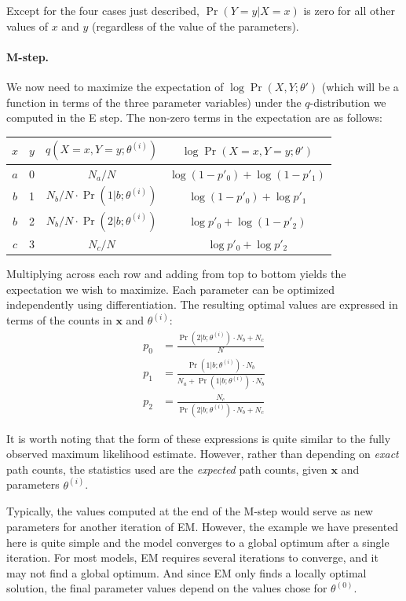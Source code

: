 \noindent Except for the four cases just described, $\Pr(Y=y|X=x)$ is
zero for all other values of $x$ and $y$ (regardless of the value of
the parameters).

\paragraph{\textbf{M-step.}}
We now need to maximize the expectation of $\log \Pr(X,Y;\theta')$
(which will be a function in terms of the three parameter variables)
under the $q$-distribution we computed in the E step.  The non-zero
terms in the expectation are as follows:
\begin{center}
\begin{tabular}{c|c|c|c}
$x$ & $y$ & $q(X=x,Y=y;\theta^{(i)})$ & $\log \Pr(X=x,Y=y;\theta')$ \\
\hline
$a$ & 0 & $N_a/N$ & $\log (1-p'_0) + \log (1 - p'_1)$ \\
$b$ & 1 & $N_b/N \cdot \Pr(1|b;\theta^{(i)}) $ & $\log(1 - p'_0) + \log p'_1$ \\
$b$ & 2 & $N_b/N \cdot \Pr(2|b;\theta^{(i)}) $ & $\log p'_0 + \log (1-p'_2)$ \\
$c$ & 3 & $N_c/N$ & $\log p'_0 + \log p'_2$ \\
\end{tabular}
\end{center}

\noindent Multiplying across each row and adding from top to bottom
yields the expectation we wish to maximize.  Each parameter can be
optimized independently using differentiation.  The resulting optimal
values are expressed in terms of the counts in $\textbf{x}$ and
$\theta^{(i)}$:
\begin{align}
p_0 &= \frac{\Pr(2|b;\theta^{(i)}) \cdot N_b + N_c}{N} \\
p_1 &= \frac{\Pr(1|b;\theta^{(i)}) \cdot N_b}{N_a + \Pr(1|b;\theta^{(i)}) \cdot N_b} \\
p_2 &= \frac{N_c}{\Pr(2|b;\theta^{(i)}) \cdot N_b + N_c}
\end{align}

\noindent It is worth noting that the form of these expressions is
quite similar to the fully observed maximum likelihood estimate.
However, rather than depending on \emph{exact} path counts, the
statistics used are the \emph{expected} path counts, given
$\textbf{x}$ and parameters $\theta^{(i)}$.

Typically, the values computed at the end of the M-step would serve as
new parameters for another iteration of EM.  However, the example we
have presented here is quite simple and the model converges to a
global optimum after a single iteration.  For most models, EM requires
several iterations to converge, and it may not find a global optimum.
And since EM only finds a locally optimal solution, the final
parameter values depend on the values chose for $\theta^{(0)}$.

